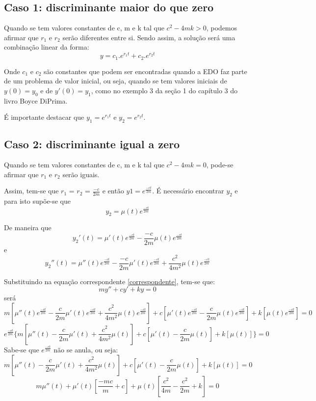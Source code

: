 \documentclass[12pt]{article}
\begin{document}
\subsection{Caso 1: discriminante maior do que zero}

Quando se tem valores constantes de c, m e k tal que $c^2 - 4mk > 0$, podemos afirmar que 
$r_1$ e $r_2$ serão diferentes entre si. Sendo assim, a solução será uma combinação linear da forma:
\[y = c_1.e^{r_1t} + c_2.e^{r_2t}\]

Onde $c_1$ e $c_2$ são constantes que podem ser encontradas quando a EDO faz parte de um problema
de valor inicial, ou seja, quando se tem valores iniciais de $y(0)=y_0$ e de $y'(0)=y_1$, como no 
exemplo 3 da seção 1 do capítulo 3 do livro Boyce DiPrima. 

É importante destacar que  $y_1 = e^{r_1t}$ e $y_2 = e^{r_2t}$.

\subsection{Caso 2: discriminante igual a zero}

Quando se tem valores constantes de c, m e k tal que $c^2 - 4mk = 0$, pode-se afirmar que 
$r_1$ e $r_2$ serão iguais. 

Assim, tem-se que $r_1$ = $r_2$ = $\frac{-c}{2m}$ e 
então $y1=e^{\frac{-ct}{2m}}$. É necessário encontrar $y_2$ e para isto supõe-se que 
\[ y_2= \mu (t)e^{\frac{-ct}{2m}}\]

De maneira que
\[y_2'(t) = \mu '(t)e^{\frac{-ct}{2m}} -\frac{-c}{2m}\mu (t)e^{\frac{-ct}{2m}} \] 
e 
\[y_2''(t) = \mu ''(t)e^{\frac{-ct}{2m}} -\frac{-c}{2m}\mu '(t)e^{\frac{-ct}{2m}} + \frac{c^2}{4m^2}\mu (t)e^{\frac{-ct}{2m}}\]

Substituindo na equação correspondente \ref{correspondente}, tem-se que:
\[ my'' + cy'  + ky = 0\]
será
\[ m[\mu ''(t)e^{\frac{-ct}{2m}} -\frac{c}{2m}\mu '(t)e^{\frac{-ct}{2m}} + \frac{c^2}{4m^2}\mu (t)e^{\frac{-ct}{2m}}] + c[\mu '(t)e^{\frac{-ct}{2m}} -\frac{c}{2m}\mu (t)e^{\frac{-ct}{2m}}] + k[\mu (t)e^{\frac{-ct}{2m}}] = 0\]
\[ e^{\frac{-ct}{2m}} \{m[\mu ''(t) - \frac{c}{2m}\mu '(t) + \frac{c^2}{4m^2}\mu (t)] + c[\mu '(t) -\frac{c}{2m}\mu (t)] + k[\mu (t)]\} = 0 \]
Sabe-se que $e^{\frac{-ct}{2m}}$ não se anula, ou seja: 
\[m[\mu ''(t) - \frac{c}{2m}\mu '(t) + \frac{c^2}{4m^2}\mu (t)] + c[\mu '(t) -\frac{c}{2m}\mu (t)] + k[\mu (t)] = 0\]
\[ m\mu ''(t)  + \mu '(t)[\frac{-mc}{m} + c] + \mu (t) [\frac{c^2}{4m} - \frac{c^2}{2m} + k] = 0\]
\end{document}

